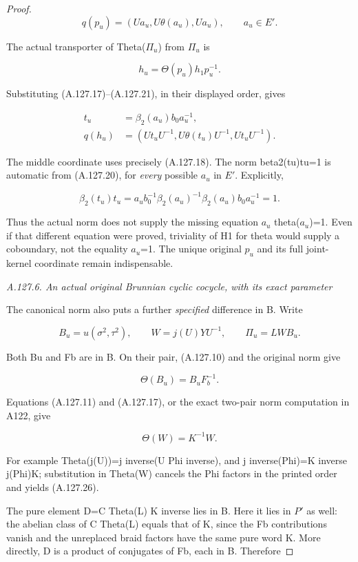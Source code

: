 \begin{proof}
\[
 q(p_u)=(U a_u,U\theta(a_u),U a_u),\qquad a_u\in E'.
\tag{A.127.21}
\]

The actual transporter of Theta(\(\Pi_u\)) from \(\Pi_u\) is

\[
 h_u=\Theta(p_u)h_1p_u^{-1}.
\tag{A.127.22}
\]

Substituting (A.127.17)--(A.127.21), in their displayed order, gives

\[
 \begin{aligned}
 t_u&=\beta_2(a_u)b_0a_u^{-1},\\
 q(h_u)&=(U t_u U^{-1},U\theta(t_u)U^{-1},U t_u U^{-1}).
 \end{aligned}
\tag{A.127.23}
\]

The middle coordinate uses precisely (A.127.18). The norm beta2(tu)tu=1 is automatic from (A.127.20), for \emph{every} possible \(a_u\) in \(E'\). Explicitly,

\[
 \beta_2(t_u)t_u
 =a_u b_0^{-1}\beta_2(a_u)^{-1}
          \beta_2(a_u)b_0a_u^{-1}=1.
\tag{A.127.24}
\]

Thus the actual norm does not supply the missing equation \(a_u\) theta(\(a_u\))=1. Even if that different equation were proved, triviality of H1 for theta would supply a coboundary, not the equality \(a_u\)=1. The unique original \(p_u\) and its full joint-kernel coordinate remain indispensable.

\par\smallskip\noindent\emph{A.127.6. An actual original Brunnian cyclic cocycle, with its exact parameter}

The canonical norm also puts a further \emph{specified} difference in B. Write

\[
 B_u=u(\sigma^2,\tau^2),\qquad
 W=j(U)YU^{-1},\qquad \Pi_u=LWB_u.
\]

Both Bu and Fb are in B. On their pair, (A.127.10) and the original norm give

\[
 \Theta(B_u)=B_uF_b^{-1}.
\tag{A.127.25}
\]

Equations (A.127.11) and (A.127.17), or the exact two-pair norm computation in A122, give

\[
 \Theta(W)=K^{-1}W.
\tag{A.127.26}
\]

For example Theta(j(U))=j inverse(U Phi inverse), and
j inverse(Phi)=K inverse j(Phi)K; substitution in Theta(W) cancels the Phi factors in the printed order and yields (A.127.26).

The pure element D=C Theta(L) K inverse lies in B. Here it lies in \(P'\) as well: the abelian class of C Theta(L) equals that of K, since the Fb contributions vanish and the unreplaced braid factors have the same pure word K. More directly, D is a product of conjugates of Fb, each in B. Therefore


\end{proof}
